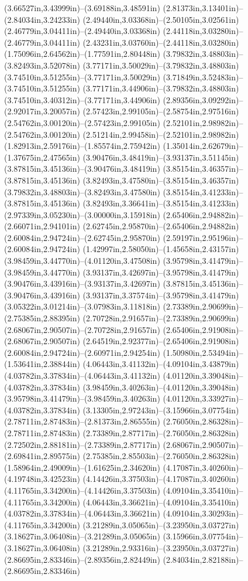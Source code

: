 (3.66527in,3.43999in)--(3.69188in,3.48591in) (2.81373in,3.13401in)--(2.84034in,3.24233in) (2.49440in,3.03368in)--(2.50105in,3.02561in) (2.46779in,3.04411in)--(2.49440in,3.03368in) (2.44118in,3.03280in)--(2.46779in,3.04411in) (2.43231in,3.03760in)--(2.44118in,3.03280in) (1.75096in,2.64562in)--(1.77591in,2.80448in) (3.79832in,3.48803in)--(3.82493in,3.52078in) (3.77171in,3.50029in)--(3.79832in,3.48803in) (3.74510in,3.51255in)--(3.77171in,3.50029in) (3.71849in,3.52483in)--(3.74510in,3.51255in) (3.77171in,3.44906in)--(3.79832in,3.48803in) (3.74510in,3.40312in)--(3.77171in,3.44906in) (2.89356in,3.09292in)--(2.92017in,3.20057in) (2.57423in,2.99105in)--(2.58754in,2.97516in) (2.54762in,3.00120in)--(2.57423in,2.99105in) (2.52101in,2.98982in)--(2.54762in,3.00120in) (2.51214in,2.99458in)--(2.52101in,2.98982in) (1.82913in,2.59176in)--(1.85574in,2.75942in) (1.35014in,2.62679in)--(1.37675in,2.47565in) (3.90476in,3.48419in)--(3.93137in,3.51145in) (3.87815in,3.45136in)--(3.90476in,3.48419in) (3.85154in,3.46357in)--(3.87815in,3.45136in) (3.82493in,3.47580in)--(3.85154in,3.46357in) (3.79832in,3.48803in)--(3.82493in,3.47580in) (3.85154in,3.41233in)--(3.87815in,3.45136in) (3.82493in,3.36641in)--(3.85154in,3.41233in) (2.97339in,3.05230in)--(3.00000in,3.15918in) (2.65406in,2.94882in)--(2.66071in,2.94101in) (2.62745in,2.95870in)--(2.65406in,2.94882in) (2.60084in,2.94724in)--(2.62745in,2.95870in) (2.59197in,2.95196in)--(2.60084in,2.94724in) (1.42997in,2.58050in)--(1.45658in,2.43157in) (3.98459in,3.44770in)--(4.01120in,3.47508in) (3.95798in,3.41479in)--(3.98459in,3.44770in) (3.93137in,3.42697in)--(3.95798in,3.41479in) (3.90476in,3.43916in)--(3.93137in,3.42697in) (3.87815in,3.45136in)--(3.90476in,3.43916in) (3.93137in,3.37574in)--(3.95798in,3.41479in) (3.05322in,3.01214in)--(3.07983in,3.11818in) (2.73389in,2.90699in)--(2.75385in,2.88395in) (2.70728in,2.91657in)--(2.73389in,2.90699in) (2.68067in,2.90507in)--(2.70728in,2.91657in) (2.65406in,2.91908in)--(2.68067in,2.90507in) (2.64519in,2.92377in)--(2.65406in,2.91908in) (2.60084in,2.94724in)--(2.60971in,2.94254in) (1.50980in,2.53494in)--(1.53641in,2.38844in) (4.06443in,3.41132in)--(4.09104in,3.43879in) (4.03782in,3.37834in)--(4.06443in,3.41132in) (4.01120in,3.39048in)--(4.03782in,3.37834in) (3.98459in,3.40263in)--(4.01120in,3.39048in) (3.95798in,3.41479in)--(3.98459in,3.40263in) (4.01120in,3.33927in)--(4.03782in,3.37834in) (3.13305in,2.97243in)--(3.15966in,3.07754in) (2.78711in,2.87483in)--(2.81373in,2.86555in) (2.76050in,2.86328in)--(2.78711in,2.87483in) (2.73389in,2.87717in)--(2.76050in,2.86328in) (2.72502in,2.88181in)--(2.73389in,2.87717in) (2.68067in,2.90507in)--(2.69841in,2.89575in) (2.75385in,2.85503in)--(2.76050in,2.86328in) (1.58964in,2.49009in)--(1.61625in,2.34620in) (4.17087in,3.40260in)--(4.19748in,3.42523in) (4.14426in,3.37503in)--(4.17087in,3.40260in) (4.11765in,3.34200in)--(4.14426in,3.37503in) (4.09104in,3.35410in)--(4.11765in,3.34200in) (4.06443in,3.36621in)--(4.09104in,3.35410in) (4.03782in,3.37834in)--(4.06443in,3.36621in) (4.09104in,3.30293in)--(4.11765in,3.34200in) (3.21289in,3.05065in)--(3.23950in,3.03727in) (3.18627in,3.06408in)--(3.21289in,3.05065in) (3.15966in,3.07754in)--(3.18627in,3.06408in) (3.21289in,2.93316in)--(3.23950in,3.03727in) (2.86695in,2.83346in)--(2.89356in,2.82449in) (2.84034in,2.82188in)--(2.86695in,2.83346in) 